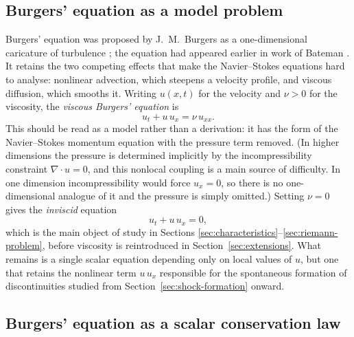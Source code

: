 \subsection{Burgers' equation as a model problem}
\label{subsec:fluid-origin}

Burgers' equation was proposed by J.~M.~Burgers as a one-dimensional
caricature of turbulence \cite{burgers1948}; the equation had appeared
earlier in work of Bateman \cite{bateman1915}. It retains the two
competing effects that make the Navier--Stokes equations hard to analyse:
nonlinear advection, which steepens a velocity profile, and viscous
diffusion, which smooths it. Writing $u(x,t)$ for the velocity and
$\nu>0$ for the viscosity, the \emph{viscous Burgers' equation} is
\begin{equation}
  \label{eq:viscous-burgers}
  u_t + u\, u_x = \nu\, u_{xx}.
\end{equation}
This should be read as a model rather than a derivation: it has the form
of the Navier--Stokes momentum equation with the pressure term removed.
(In higher dimensions the pressure is determined implicitly by the
incompressibility constraint $\nabla\!\cdot u=0$, and this nonlocal
coupling is a main source of difficulty. In one dimension incompressibility
would force $u_x=0$, so there is no one-dimensional analogue of it and the
pressure is simply omitted.) Setting $\nu = 0$ gives the \emph{inviscid}
equation
\begin{equation}
  \label{eq:inviscid-burgers}
  u_t + u\, u_x = 0,
\end{equation}
which is the main object of study in Sections
\ref{sec:characteristics}--\ref{sec:riemann-problem}, before viscosity is
reintroduced in Section~\ref{sec:extensions}. What remains is a single
scalar equation depending only on local values of $u$, but one that
retains the nonlinear term $u\,u_x$ responsible for the spontaneous
formation of discontinuities studied from
Section~\ref{sec:shock-formation} onward.

\subsection{Burgers' equation as a scalar conservation law}
\label{subsec:conservation-law-framework}

